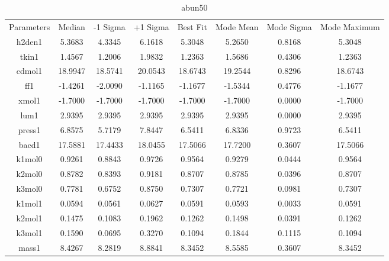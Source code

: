 \begin{table}
\caption{abun50}
\begin{tabular}{cccccccc}
Parameters & Median & -1 Sigma & +1 Sigma & Best Fit & Mode Mean & Mode Sigma & Mode Maximum \\
h2den1 & 5.3683 & 4.3345 & 6.1618 & 5.3048 & 5.2650 & 0.8168 & 5.3048 \\
tkin1 & 1.4567 & 1.2006 & 1.9832 & 1.2363 & 1.5686 & 0.4306 & 1.2363 \\
cdmol1 & 18.9947 & 18.5741 & 20.0543 & 18.6743 & 19.2544 & 0.8296 & 18.6743 \\
ff1 & -1.4261 & -2.0090 & -1.1165 & -1.1677 & -1.5344 & 0.4776 & -1.1677 \\
xmol1 & -1.7000 & -1.7000 & -1.7000 & -1.7000 & -1.7000 & 0.0000 & -1.7000 \\
lum1 & 2.9395 & 2.9395 & 2.9395 & 2.9395 & 2.9395 & 0.0000 & 2.9395 \\
press1 & 6.8575 & 5.7179 & 7.8447 & 6.5411 & 6.8336 & 0.9723 & 6.5411 \\
bacd1 & 17.5881 & 17.4433 & 18.0455 & 17.5066 & 17.7200 & 0.3607 & 17.5066 \\
k1mol0 & 0.9261 & 0.8843 & 0.9726 & 0.9564 & 0.9279 & 0.0444 & 0.9564 \\
k2mol0 & 0.8782 & 0.8393 & 0.9181 & 0.8707 & 0.8785 & 0.0396 & 0.8707 \\
k3mol0 & 0.7781 & 0.6752 & 0.8750 & 0.7307 & 0.7721 & 0.0981 & 0.7307 \\
k1mol1 & 0.0594 & 0.0561 & 0.0627 & 0.0591 & 0.0593 & 0.0033 & 0.0591 \\
k2mol1 & 0.1475 & 0.1083 & 0.1962 & 0.1262 & 0.1498 & 0.0391 & 0.1262 \\
k3mol1 & 0.1590 & 0.0695 & 0.3270 & 0.1094 & 0.1844 & 0.1115 & 0.1094 \\
mass1 & 8.4267 & 8.2819 & 8.8841 & 8.3452 & 8.5585 & 0.3607 & 8.3452 \\
\end{tabular}
\end{table}
